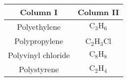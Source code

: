 \begin{tabular}[12pt]{ |c| c|}
    \hline
    \textbf{Column I} & \textbf{Column II}\\ 
    \hline
    Polyethylene & $\text{C}_3\text{H}_6$ \\
    \hline 
    Polypropylene & $\text{C}_2\text{H}_3$Cl \\
    \hline
    Polyvinyl chloride & $\text{C}_8\text{H}_8$ \\
    \hline
    Polystyrene & $\text{C}_2\text{H}_4$ \\
    \hline
    \end{tabular}

